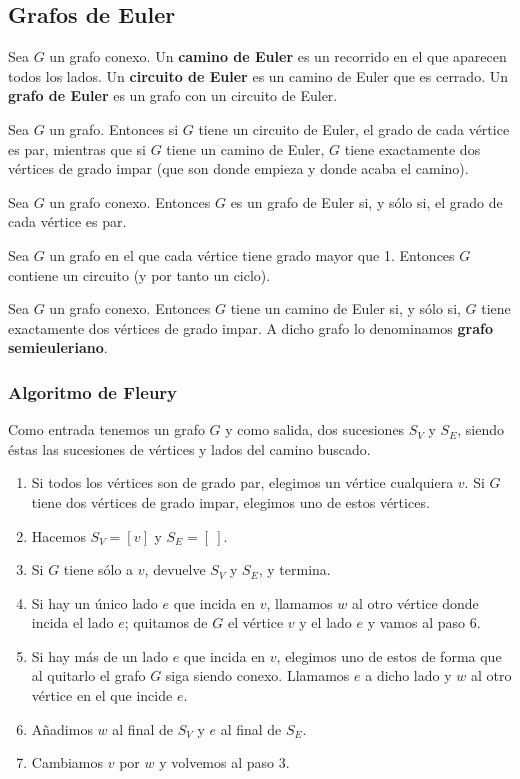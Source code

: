 \subsection{Grafos de Euler}
\begin{ndef}
    Sea $G$ un grafo conexo. Un \textbf{camino de Euler} es un recorrido en el que aparecen todos los lados. Un \textbf{circuito de Euler} es un camino de Euler que es cerrado. Un \textbf{grafo de Euler} es un grafo con un circuito de Euler.
\end{ndef}

\begin{nprop}
    Sea $G$ un grafo. Entonces si $G$ tiene un circuito de Euler, el grado de cada vértice es par, mientras que si $G$ tiene un camino de Euler, $G$ tiene exactamente dos vértices de grado impar (que son donde empieza y donde acaba el camino).
\end{nprop}

\begin{nth}
    Sea $G$ un grafo conexo. Entonces $G$ es un grafo de Euler si, y sólo si, el grado de cada vértice es par.
\end{nth}

\begin{lema}
    Sea $G$ un grafo en el que cada vértice tiene grado mayor que 1. Entonces $G$ contiene un circuito (y por tanto un ciclo).
\end{lema}

\begin{ncor}
    Sea $G$ un grafo conexo. Entonces $G$ tiene un camino de Euler si, y sólo si, $G$ tiene exactamente dos vértices de grado impar. A dicho grafo lo denominamos \textbf{grafo semieuleriano}.
\end{ncor}

\subsubsection{Algoritmo de Fleury}
Como entrada tenemos un grafo $G$ y como salida, dos sucesiones $S_V$ y $S_E$, siendo éstas las sucesiones de vértices y lados del camino buscado.
\begin{enumerate}
    \item Si todos los vértices son de grado par, elegimos un vértice cualquiera $v$. Si $G$ tiene dos vértices de grado impar, elegimos uno de estos vértices.
    \item Hacemos $S_V = [v]$ y $S_E = [\ ]$.
    \item Si $G$ tiene sólo a $v$, devuelve $S_V$ y $S_E$, y termina.
    \item Si hay un único lado $e$ que incida en $v$, llamamos $w$ al otro vértice donde incida el lado $e$; quitamos de $G$ el vértice $v$ y el lado $e$ y vamos al paso 6.
    \item Si hay más de un lado $e$ que incida en $v$, elegimos uno de estos de forma que al quitarlo el grafo $G$ siga siendo conexo. Llamamos $e$ a dicho lado y $w$ al otro vértice en el que incide $e$.
    \item Añadimos $w$ al final de $S_V$ y $e$ al final de $S_E$.
    \item Cambiamos $v$ por $w$ y volvemos al paso 3.
\end{enumerate}

